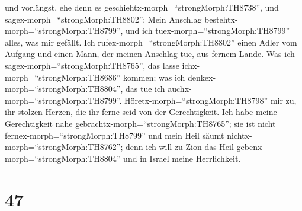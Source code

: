 und vorlängst, ehe denn es geschiehtx-morph=``strongMorph:TH8738'', und
sagex-morph=``strongMorph:TH8802'': Mein Anschlag
bestehtx-morph=``strongMorph:TH8799'', und ich
tuex-morph=``strongMorph:TH8799'' alles, was mir gefällt. 
Ich rufex-morph=``strongMorph:TH8802'' einen Adler vom Aufgang und einen
Mann, der meinen Anschlag tue, aus fernem Lande. Was ich
sagex-morph=``strongMorph:TH8765'', das lasse
ichx-morph=``strongMorph:TH8686'' kommen; was ich
denkex-morph=``strongMorph:TH8804'', das tue ich
auchx-morph=``strongMorph:TH8799''. 
Höretx-morph=``strongMorph:TH8798'' mir zu, ihr stolzen Herzen, die ihr
ferne seid von der Gerechtigkeit.  Ich habe meine
Gerechtigkeit nahe gebrachtx-morph=``strongMorph:TH8765''; sie ist nicht
fernex-morph=``strongMorph:TH8799'' und mein Heil säumt
nichtx-morph=``strongMorph:TH8762''; denn ich will zu Zion das Heil
gebenx-morph=``strongMorph:TH8804'' und in Israel meine Herrlichkeit.

\hypertarget{section-46}{%
\section{47}\label{section-46}}

